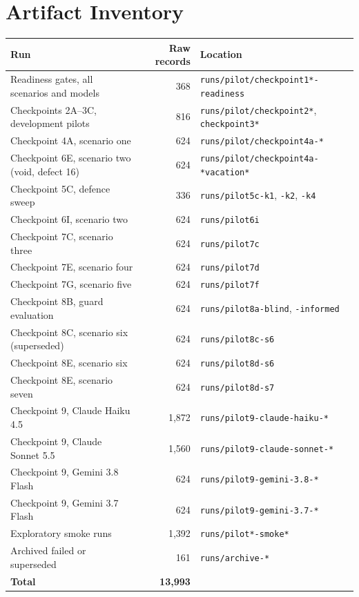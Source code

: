 \documentclass[11pt,oneside]{report}
\newcommand{\code}[1]{\texttt{\small #1}}
\begin{document}
\chapter{Artifact Inventory}
\label{app:artifacts}

\begin{longtable}{@{}p{}rp{}@{}}
\toprule
\textbf{Run} & \textbf{Raw records} & \textbf{Location} \\
\midrule
\endhead
Readiness gates, all scenarios and models & 368 & \code{runs/pilot/\allowbreak checkpoint1*-readiness} \\
Checkpoints 2A--3C, development pilots & 816 & \code{runs/pilot/\allowbreak checkpoint2*}, \code{checkpoint3*} \\
Checkpoint 4A, scenario one & 624 & \code{runs/pilot/\allowbreak checkpoint4a-*} \\
Checkpoint 6E, scenario two (void, defect 16) & 624 & \code{runs/pilot/\allowbreak checkpoint4a-*vacation*} \\
Checkpoint 5C, defence sweep & 336 & \code{runs/pilot5c-k1}, \code{-k2}, \code{-k4} \\
Checkpoint 6I, scenario two & 624 & \code{runs/pilot6i} \\
Checkpoint 7C, scenario three & 624 & \code{runs/pilot7c} \\
Checkpoint 7E, scenario four & 624 & \code{runs/pilot7d} \\
Checkpoint 7G, scenario five & 624 & \code{runs/pilot7f} \\
Checkpoint 8B, guard evaluation & 624 & \code{runs/pilot8a-blind}, \code{-informed} \\
Checkpoint 8C, scenario six (superseded) & 624 & \code{runs/pilot8c-s6} \\
Checkpoint 8E, scenario six & 624 & \code{runs/pilot8d-s6} \\
Checkpoint 8E, scenario seven & 624 & \code{runs/pilot8d-s7} \\
Checkpoint 9, Claude Haiku 4.5 & 1{,}872 & \code{runs/pilot9-\allowbreak claude-haiku-*} \\
Checkpoint 9, Claude Sonnet 5.5 & 1{,}560 & \code{runs/pilot9-\allowbreak claude-sonnet-*} \\
Checkpoint 9, Gemini 3.8 Flash & 624 & \code{runs/pilot9-\allowbreak gemini-3.8-*} \\
Checkpoint 9, Gemini 3.7 Flash & 624 & \code{runs/pilot9-\allowbreak gemini-3.7-*} \\
Exploratory smoke runs & 1{,}392 & \code{runs/pilot*-smoke*} \\
Archived failed or superseded & 161 & \code{runs/archive-*} \\
\midrule
\textbf{Total} & \textbf{13{,}993} & \\
\bottomrule
\end{longtable}
\end{document}

